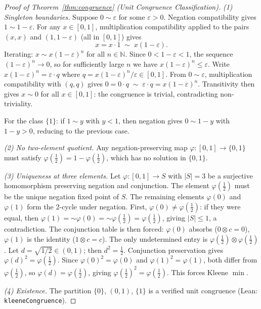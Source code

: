\documentclass[11pt,a4paper]{article}
\newcommand{\negc}{\mathord{\sim}}
\newcommand{\conjc}{\otimes}
\newcommand{\Nat}{\mathbb{N}}
\begin{document}
\begin{proof}[Proof of Theorem~\ref{thm:congruence}
(Unit Congruence Classification)]

\emph{(1) Singleton boundaries.}
Suppose $0 \sim \varepsilon$ for some $\varepsilon > 0$.
Negation compatibility gives $1 \sim 1 - \varepsilon$.
For any $x \in [0,1]$, multiplication compatibility applied to the
pairs $(x, x)$ and $(1, 1 - \varepsilon)$ (all in $[0,1]$) gives
\[
x = x \cdot 1 \;\sim\; x(1 - \varepsilon).
\]
Iterating: $x \sim x(1-\varepsilon)^n$ for all $n \in \Nat$.
Since $0 < 1 - \varepsilon < 1$, the sequence
$(1-\varepsilon)^n \to 0$, so for sufficiently large $n$ we have
$x(1-\varepsilon)^n \leq \varepsilon$.
Write $x(1-\varepsilon)^n = \varepsilon \cdot q$ where
$q = x(1-\varepsilon)^n / \varepsilon \in [0,1]$.
From $0 \sim \varepsilon$, multiplication compatibility with
$(q, q)$ gives
$0 = 0 \cdot q \;\sim\; \varepsilon \cdot q = x(1-\varepsilon)^n$.
Transitivity then gives $x \sim 0$ for all $x \in [0,1]$:
the congruence is trivial, contradicting non-triviality.

For the class $\{1\}$: if $1 \sim y$ with $y < 1$, then
negation gives $0 \sim 1 - y$ with $1 - y > 0$, reducing to
the previous case.

\emph{(2) No two-element quotient.}
Any negation-preserving map $\varphi : [0,1] \to \{0,1\}$ must
satisfy $\varphi(\tfrac{1}{2}) = 1 - \varphi(\tfrac{1}{2})$, which
has no solution in $\{0,1\}$.

\emph{(3) Uniqueness at three elements.}
Let $\varphi : [0,1] \to S$ with $|S| = 3$ be a surjective
homomorphism preserving negation and conjunction.
The element $\varphi(\tfrac{1}{2})$ must be the unique negation
fixed point of $S$.
The remaining elements $\varphi(0)$ and $\varphi(1)$ form the
2-cycle under negation.
First, $\varphi(0) \neq \varphi(\tfrac{1}{2})$: if they were equal,
then $\varphi(1) = \negc\varphi(0) = \negc\varphi(\tfrac{1}{2})
= \varphi(\tfrac{1}{2})$, giving $|S| \leq 1$, a contradiction.
The conjunction table is then forced:
$\varphi(0)$ absorbs ($0 \conjc c = 0$), $\varphi(1)$ is the
identity ($1 \conjc c = c$).
The only undetermined entry is
$\varphi(\tfrac{1}{2}) \conjc \varphi(\tfrac{1}{2})$.
Let $d = \sqrt{1/2} \in (0,1)$; then $d^2 = \tfrac{1}{2}$.
Conjunction preservation gives
$\varphi(d)^2 = \varphi(\tfrac{1}{2})$.
Since $\varphi(0)^2 = \varphi(0)$ and
$\varphi(1)^2 = \varphi(1)$, both differ from
$\varphi(\tfrac{1}{2})$, so $\varphi(d) = \varphi(\tfrac{1}{2})$,
giving $\varphi(\tfrac{1}{2})^2 = \varphi(\tfrac{1}{2})$.
This forces Kleene $\min$.

\emph{(4) Existence.}
The partition $\{0\}$, $(0,1)$, $\{1\}$ is a verified
unit congruence (Lean: \texttt{kleene\-Congruence}).
\end{proof}
\end{document}
